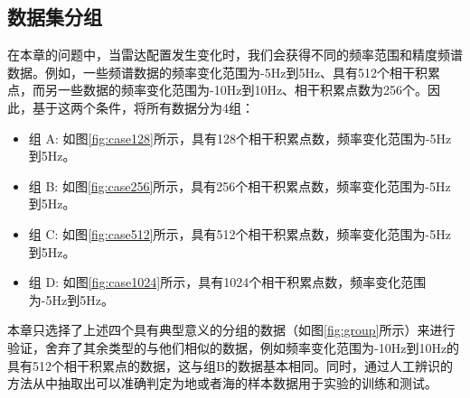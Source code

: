 \subsection{数据集分组}
在本章的问题中，当雷达配置发生变化时，我们会获得不同的频率范围和精度频谱数据。例如，一些频谱数据的频率变化范围为-5Hz到5Hz、具有512个相干积累点，而另一些数据的频率变化范围为-10Hz到10Hz、相干积累点数为256个。因此，基于这两个条件，将所有数据分为4组：
\begin{itemize}
	\item 组 A: 如图\ref{fig:case128}所示，具有128个相干积累点数，频率变化范围为-5Hz到5Hz。
	\item 组 B: 如图\ref{fig:case256}所示，具有256个相干积累点数，频率变化范围为-5Hz到5Hz。
	\item 组 C: 如图\ref{fig:case512}所示，具有512个相干积累点数，频率变化范围为-5Hz到5Hz。
	\item 组 D: 如图\ref{fig:case1024}所示，具有1024个相干积累点数，频率变化范围为-5Hz到5Hz。
\end{itemize}
本章只选择了上述四个具有典型意义的分组的数据（如图\ref{fig:group}所示）来进行验证，舍弃了其余类型的与他们相似的数据，例如频率变化范围为-10Hz到10Hz的具有512个相干积累点的数据，这与组B的数据基本相同。同时，通过人工辨识的方法从中抽取出可以准确判定为地或者海的样本数据用于实验的训练和测试。
